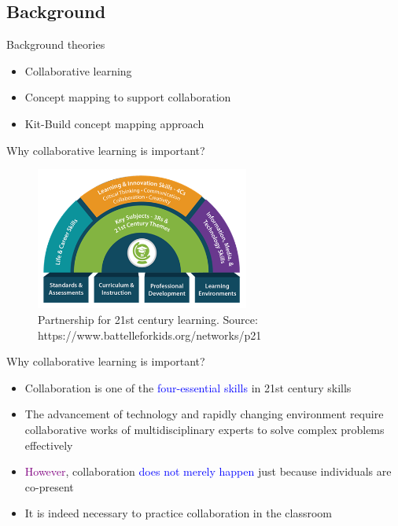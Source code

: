 \subsection{Background}

\begin{frame}{Background theories}
    \begin{itemize}
        \item Collaborative learning
        \item Concept mapping to support collaboration
        \item Kit-Build concept mapping approach
    \end{itemize}
\end{frame}

\begin{frame}{Why collaborative learning is important?}

    \begin{figure}[tb]
        \begin{center}
            \includegraphics[width=70mm]{images/p21centuryskills.png}
        \end{center}
        \caption{Partnership for 21st century learning. Source: https://www.battelleforkids.org/networks/p21}
        \label{intro::p21}
    \end{figure}
\end{frame}

\begin{frame}{Why collaborative learning is important?}

    \begin{itemize}
        \item<1->  Collaboration is one of the \textcolor{blue}{four-essential skills} in 21st century skills
        \item<1->  The advancement of technology and rapidly changing environment require 
        collaborative works of multidisciplinary experts to solve complex problems effectively
        \item<2->  \textcolor{purple}{However}, collaboration \textcolor{blue}{does not merely happen} just because individuals are co-present 
        \item<2->  It is indeed necessary to practice collaboration in the classroom
    \end{itemize}
\end{frame}

